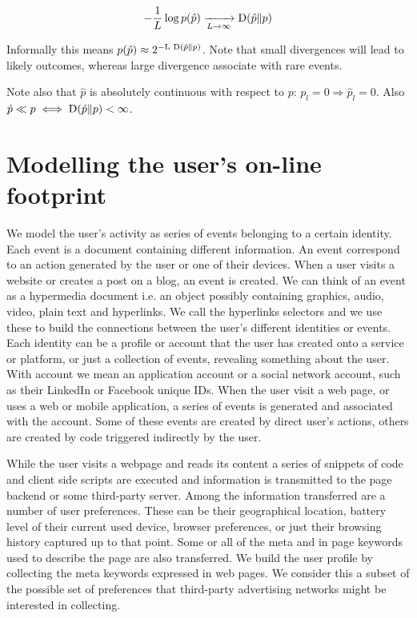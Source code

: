 $$ - \frac {1}{L} \log{p(\hat{p})} \xrightarrow[L \to \infty]{} \textnormal{D}(\hat{p} \| p) $$

Informally this means $p(\hat{p}) \approx 2^{-\textnormal{L D}(\hat{p} \| p) } $. Note that small divergences will lead to likely outcomes, whereas large divergence associate with rare events. 

Note also that $\hat{p}$ is absolutely continuous with respect to $p$: $p_l = 0 \Rightarrow \hat{p}_l = 0$. Also $\hat{p} \ll p \iff  \textnormal{D}(\hat{p} \| p) < \infty$.

\section{Modelling the user's on-line footprint}
We model the user's activity as series of events belonging to a certain identity. Each event is a document containing different information. An event correspond to an action generated by the user or one of their devices. When a user visits a website or creates a post on a blog, an event is created. We can think of an event as a hypermedia document i.e. an object possibly containing graphics, audio, video, plain text and hyperlinks. We call the hyperlinks selectors and we use these to build the connections between the user's different identities or events. Each identity can be a profile or account that the user has created onto a service or platform, or just a collection of events, revealing something about the user. With account we mean an application account or a social network account, such as their LinkedIn or Facebook unique IDs. When the user visit a web page, or uses a web or mobile application, a series of events is generated and associated with the account. Some of these events are created by direct user's actions, others are created by code triggered indirectly by the user. 

While the user visits a webpage and reads its content a series of snippets of code and client side scripts are executed and information is transmitted to the page backend or some third-party server. Among the information transferred are a number of user preferences. These can be their geographical location, battery level of their current used device, browser preferences, or just their browsing history captured up to that point. Some or all of the meta and in page keywords used to describe the page are also transferred. We build the user profile by collecting the meta keywords expressed in web pages. We consider this a subset of the possible set of preferences that third-party advertising networks might be interested in collecting.

